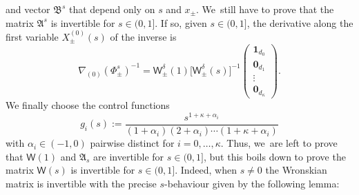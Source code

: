 \documentclass[10pt]{amsart}
\theoremstyle{definition}
\newcommand{\sW}{{\mathsf W}}
\newcommand{\U}{\mathbf{1}}
\newcommand{\V}{\mathbf{0}}
\begin{document}
and vector $\mathfrak B^s$ that depend only on $s$ and $x_\pm$. We~still have to prove that the matrix $\mathfrak A^s$ is
invertible for $s \in (0,1]$. If so, given $s \in (0,1]$, the
derivative along the first variable $X^{(0)}_\pm(s)$ of the
inverse is
\begin{equation}
\label{eq:first-der-k}
\nabla_{(0)} \left(\Phi_\pm ^s \right)^{-1} = \sW_\pm ^\delta
(1) \big[\sW_\pm ^\delta(s)\big]^{-1}
\begin{pmatrix}
\U_{d_0} \\ \V_{d_1} \\ \vdots \\ \V_{d_\kappa}
\end{pmatrix}\!.
\end{equation}
We finally choose the control functions
\begin{equation}\label{eq:choice-g}
g_i(s) := \frac{s^{1+\kappa+\alpha_i}}{(1+\alpha_i)(2+\alpha_i)
\cdots (1+\kappa+\alpha_i)}
\end{equation}
with $\alpha_i \in (-1,0)$ pairwise distinct for
$i=0,\dots,\kappa$.
Thus, we~are left to prove that $\mathsf W(1)$ and $\mathfrak{A}_s$ are invertible for $s \in (0,1]$, but this boils down to prove the matrix $\mathsf W(s)$ is invertible for $s \in (0,1]$. Indeed, when $s \ne 0$ the Wronskian matrix is
invertible with the precise $s$-behaviour given by the following
lemma:
\end{document}
